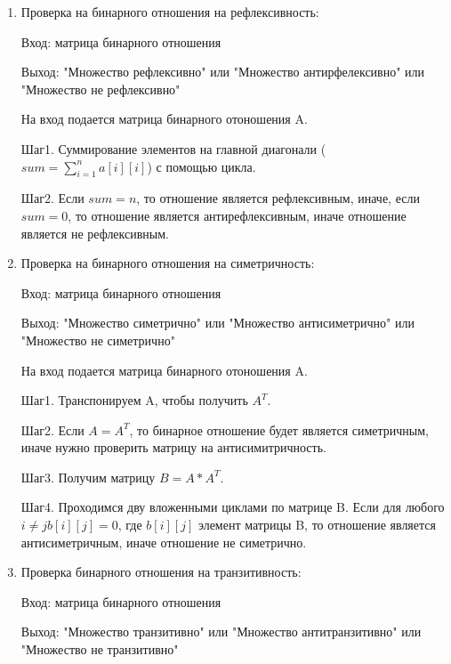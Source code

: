 \documentclass[spec, och, labwork]{shiza}
\begin{document}
            \begin{enumerate}
                \item Проверка на бинарного отношения на рефлексивность:

                Вход: матрица бинарного отношения

                Выход: "Множество рефлексивно" или "Множество антирфелексивно" или "Множество не рефлексивно"
                
                На вход подается матрица бинарного отоношения A. 
                
                Шаг1. Суммирование элементов на главной диагонали ($sum = \sum\limits_{i=1}^n a[i][i]$) с помощью цикла. 
                
                Шаг2. Если $sum = n$, то отношение является рефлексивным, иначе, если $sum = 0$, то отношение является 
                антирефлексивным, иначе отношение является не рефлексивным.

                \item Проверка на бинарного отношения на симетричность:
                
                Вход: матрица бинарного отношения

                Выход: "Множество симетрично" или "Множество антисиметрично" или "Множество не симетрично"

                На вход подается матрица бинарного отоношения A. 

                Шаг1. Транспонируем A, чтобы получить $A^T$.

                Шаг2. Если $A = A^T$, то бинарное отношение будет является симетричным, иначе нужно проверить матрицу на 
                антисимитричность. 

                Шаг3. Получим матрицу $B = A * A^T$.

                Шаг4. Проходимся дву вложенными циклами по матрице B. Если для любого $i \neq j b[i][j] = 0$, где $b[i][j]$ элемент 
                матрицы B, то отношение является антисиметричным, иначе отношение не симетрично.

                \item Проверка бинарного отношения на транзитивность:
                
                Вход: матрица бинарного отношения

                Выход: "Множество транзитивно" или "Множество антитранзитивно" или "Множество не транзитивно"
                

\end{enumerate}
\end{document}
